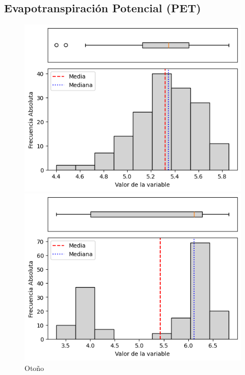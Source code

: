 \subsection{Evapotranspiración Potencial (PET)}

\begin{figure}[H]
\centering
\begin{minipage}{0.48\textwidth}
    \centering
    \includegraphics[width=\linewidth]{resultados/por_estacion_del_anio/Ancachuro/PET_HistBoxplot_Autumn.png}
    \caption*{Otoño}
\end{minipage}
\hfill
\begin{minipage}{0.48\textwidth}
    \centering
    \includegraphics[width=\linewidth]{resultados/por_estacion_del_anio/Ancachuro/PET_HistBoxplot_Spring.png}

\end{minipage}
\end{figure}
